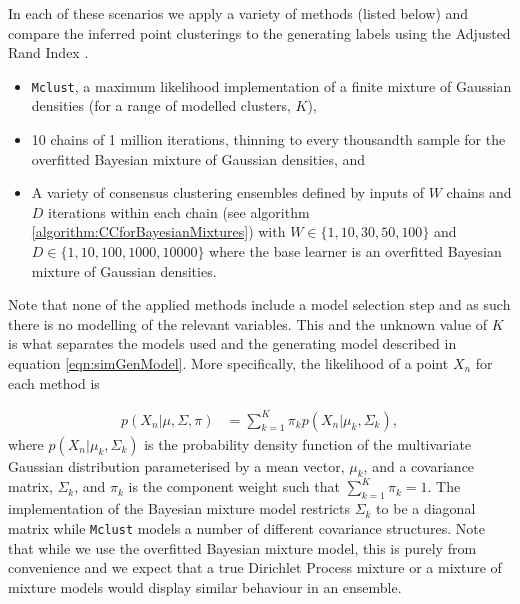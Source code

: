 \documentclass{bmcart}
\begin{document}


\noindent In each of these scenarios we apply a variety of methods (listed below) and compare the inferred point clusterings to the generating labels using the Adjusted Rand Index \citep[\textbf{ARI},][]{hubert1985comparing}.
\begin{itemize}
    \item \texttt{Mclust}, a maximum likelihood implementation of a finite mixture of Gaussian densities (for a range of modelled clusters, $K$),
    \item 10 chains of 1 million iterations, thinning to every thousandth sample for the overfitted Bayesian mixture of Gaussian densities, and
    \item A variety of consensus clustering ensembles defined by inputs of $W$ chains and $D$ iterations within each chain (see algorithm \ref{algorithm:CCforBayesianMixtures}) with $W \in \{1, 10, 30, 50, 100\}$ and $D \in \{1, 10, 100, 1000, 10000\}$ where the base learner is an overfitted Bayesian mixture of Gaussian densities.
\end{itemize}
Note that none of the applied methods include a model selection step and as such there is no modelling of the relevant variables. This and the unknown value of $K$ is what separates the models used and the generating model described in equation \ref{eqn:simGenModel}. More specifically, the likelihood of a point $X_n$ for each method is

\begin{align} \label{eqn:mixtureModel}
p(X_n | \mu, \Sigma, \pi) &= \sum_{k=1}^K \pi_k p(X_n | \mu_k, \Sigma_k),
\end{align}
where $p(X_n | \mu_k, \Sigma_k)$ is the probability density function of the multivariate Gaussian distribution parameterised by a mean vector, $\mu_k$, and a covariance matrix, $\Sigma_k$, and $\pi_k$ is the component weight such that $\sum_{k=1}^K\pi_k = 1$. The implementation of the Bayesian mixture model restricts $\Sigma_k$ to be a diagonal matrix while \texttt{Mclust} models a number of different covariance structures. Note that while we use the overfitted Bayesian mixture model, this is purely from convenience and we expect that a true Dirichlet Process mixture or a mixture of mixture models would display similar behaviour in an ensemble.
\end{document}
